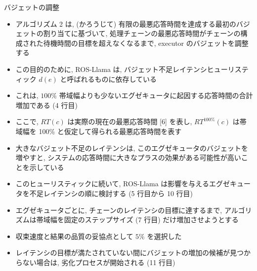 \begin{frame}{バジェットの調整}
    \begin{itemize}
        \item アルゴリズム 2 は, (かろうじて) 有限の最悪応答時間を達成する最初のバジェットの割り当てに基づいて, 処理チェーンの最悪応答時間がチェーンの構成された待機時間の目標を超えなくなるまで, executor のバジェットを調整する
        \item この目的のために, ROS-Llama は, バジェット不足レイテンシヒューリスティック $d(e)$ と呼ばれるものに依存している
        \item これは, $100 \%$ 帯域幅よりも少ないエグゼキュータに起因する応答時間の合計増加である (4 行目)
        \item ここで, $R T(c)$ は実際の現在の最悪応答時間 [6] を表し, $R T^{100 \%}(c)$ は帯域幅を 100\% と仮定して得られる最悪応答時間を表す
        \item 大きなバジェット不足のレイテンシは, このエグゼキュータのバジェットを増やすと, システムの応答時間に大きなプラスの効果がある可能性が高いことを示している
    \end{itemize}
\end{frame}

\begin{frame}{}
    \begin{itemize}
        \item このヒューリスティックに続いて, ROS-Llama は影響を与えるエグゼキュータを不足レイテンシの順に検討する (5 行目から 10 行目)
        \item エグゼキュータごとに, チェーンのレイテンシの目標に達するまで, アルゴリズムは帯域幅を固定のステップサイズ (7 行目) だけ増加させようとする
        \item 収束速度と結果の品質の妥協点として $5 \%$ を選択した
        \item レイテンシの目標が満たされていない間にバジェットの増加の候補が見つからない場合は, 劣化プロセスが開始される (11 行目)
    \end{itemize}
\end{frame}
